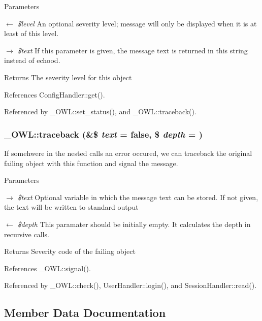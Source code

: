 \begin{DoxyParams}{Parameters}
\item[\mbox{$\leftarrow$} {\em \$level}]An optional severity level; message will only be displayed when it is at least of this level. \item[\mbox{$\rightarrow$} {\em \$text}]If this parameter is given, the message text is returned in this string instead of echood. \end{DoxyParams}
\begin{DoxyReturn}{Returns}
The severity level for this object 
\end{DoxyReturn}


References ConfigHandler::get().



Referenced by \_\-OWL::set\_\-status(), and \_\-OWL::traceback().

\subsubsection[{traceback}]{\setlength{\rightskip}{0pt plus 5cm}\_\-OWL::traceback (\&\$ {\em text} = {\ttfamily false}, \/  \$ {\em depth} = {})}\label{class__OWL_aa29547995d6741b7d2b90c1d4ea99a13}
If somehwere in the nested calls an error occured, we can traceback the original failing object with this function and signal the message.


\begin{DoxyParams}{Parameters}
\item[\mbox{$\rightarrow$} {\em \$text}]Optional variable in which the message text can be stored. If not given, the text will be written to standard output \item[\mbox{$\leftarrow$} {\em \$depth}]This paramater should be initially empty. It calculates the depth in recursive calls. \end{DoxyParams}
\begin{DoxyReturn}{Returns}
Severity code of the failing object 
\end{DoxyReturn}


References \_\-OWL::signal().



Referenced by \_\-OWL::check(), UserHandler::login(), and SessionHandler::read().



\subsection{Member Data Documentation}
